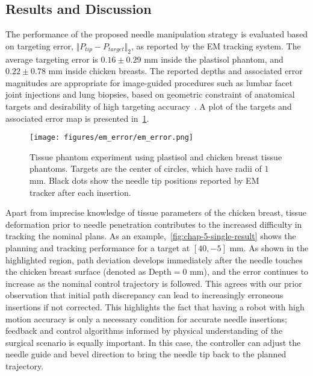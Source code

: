 \subsection{Results and Discussion}
\label{sec:chap-5-results-and-discussion}

The performance of the proposed needle manipulation strategy is evaluated based on targeting error, $\Vert P_{tip} - P_{target}\Vert_2$, as reported by the EM tracking system. The average targeting error is $0.16 \pm 0.29$ mm inside the plastisol phantom, and $0.22 \pm 0.78$ mm inside chicken breasts. The reported depths and associated error magnitudes are appropriate for image-guided procedures such as lumbar facet joint injections and lung biopsies, based on geometric constraint of anatomical targets and desirability of high targeting accuracy~\cite{simonVivoTopographicAnalysis2012, anzideiImagingGuidedChestBiopsies2017}. A plot of the targets and associated error map is presented in~\cref{fig:chap-5-em-error}.

\begin{figure}[h]
  \centering
  \texttt{[image: figures/em\_error/em\_error.png]}
  \caption{Tissue phantom experiment using plastisol and chicken breast tissue phantoms. Targets are the center of circles, which have radii of $1$ mm. Black dots show the needle tip positions reported by EM tracker after each insertion.}
  \label{fig:chap-5-em-error}
\end{figure}

Apart from imprecise knowledge of tissue parameters of the chicken breast, tissue deformation prior to needle penetration contributes to the increased difficulty in tracking the nominal plans. As an example,~\cref{fig:chap-5-single-result} shows the planning and tracking performance for a target at $[40, -5]$ mm. As shown in the highlighted region, path deviation develops immediately after the needle touches the chicken breast surface (denoted as $\text{Depth}=0$ mm), and the error continues to increase as the nominal control trajectory is followed. This agrees with our prior observation that initial path discrepancy can lead to increasingly erroneous insertions if not corrected. This highlights the fact that having a robot with high motion accuracy is only a necessary condition for accurate needle insertions; feedback and control algorithms informed by physical understanding of the surgical scenario is equally important. In this case, the controller can adjust the needle guide and bevel direction to bring the needle tip back to the planned trajectory.


